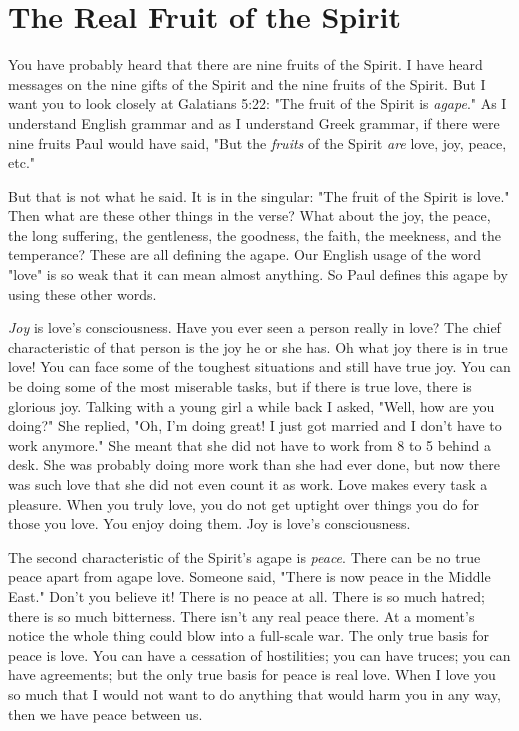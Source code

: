 \section*{The Real Fruit of the Spirit}

You have probably heard that there are nine fruits of the Spirit. I have heard messages on the nine gifts of the Spirit and the nine fruits of the Spirit. But I want you to look closely at Galatians 5:22: "The fruit of the Spirit is \emph{agape}." As I understand English grammar and as I understand Greek grammar, if there were nine fruits Paul would have said, "But the \emph{fruits} of the Spirit \emph{are} love, joy, peace, etc." 

But that is not what he said. It is in the singular: "The fruit of the Spirit is love." Then what are these other things in the verse? What about the joy, the peace, the long suffering, the gentleness, the goodness, the faith, the meekness, and the temperance? These are all defining the agape. Our English usage of the word "love" is so weak that it can mean almost anything. So Paul defines this agape by using these other words. 

\emph{Joy} is love's consciousness. Have you ever seen a person really in love? The chief characteristic of that person is the joy he or she has. Oh what joy there is in true love! You can face some of the toughest situations and still have true joy. You can be doing some of the most miserable tasks, but if there is true love, there is glorious joy. Talking with a young girl a while back I asked, "Well, how are you doing?" She replied, "Oh, I'm doing great! I just got married and I don't have to work anymore." She meant that she did not have to work from 8 to 5 behind a desk. She was probably doing more work than she had ever done, but now there was such love that she did not even count it as work. Love makes every task a pleasure. When you truly love, you do not get uptight over things you do for those you love. You enjoy doing them. Joy is love's consciousness. 

The second characteristic of the Spirit's agape is \emph{peace}. There can be no true peace apart from agape love. Someone said, "There is now peace in the Middle East." Don't you believe it! There is no peace at all. There is so much hatred; there is so much bitterness. There isn't any real peace there. At a moment's notice the whole thing could blow into a full-scale war. The only true basis for peace is love. You can have a cessation of hostilities; you can have truces; you can have agreements; but the only true basis for peace is real love. When I love you so much that I would not want to do anything that would harm you in any way, then we have peace between us. 

